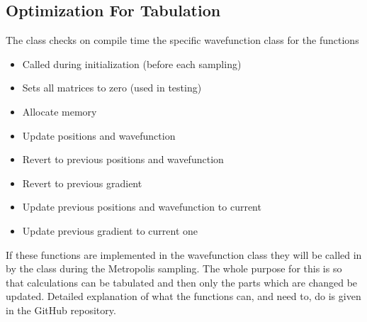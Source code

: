 \subsection{Optimization For Tabulation\label{susec:optTab}}
    The  class checks on compile time the specific
    wavefunction class for the functions 
        \begin{itemize}
            \item { Called during
                initialization (before each sampling)}
            \item { Sets all matrices
                to zero (used in testing)}
            \item {
                Allocate memory}
            \item { Update positions
                and wavefunction}
            \item { Revert to previous
                positions and wavefunction}
            \item { Revert to
                previous gradient}
            \item { Update
                previous positions and wavefunction to current}
            \item { Update
                previous gradient to current one}
        \end{itemize}
    If these functions are implemented in the
    wavefunction class they will be called in by the  class
    during the Metropolis sampling. The whole purpose for this is so that
    calculations can be tabulated and then only the parts which are changed be
    updated. Detailed explanation of what the functions can, and need to, do is
    given in the GitHub repository.

